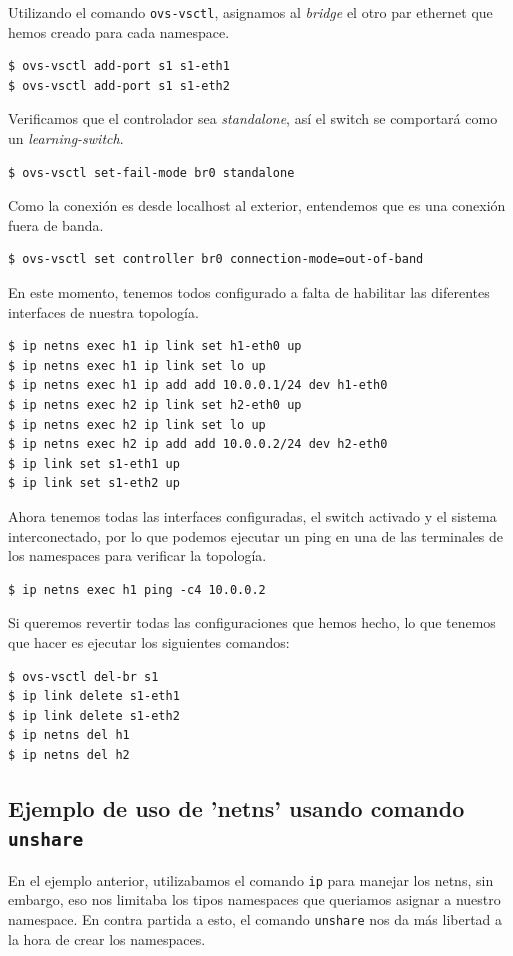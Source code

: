 \documentclass[12pt]{article}
\begin{document}
	\pagebreak
	
	\noindent Utilizando el comando \texttt{ovs-vsctl}, asignamos al \textit{bridge} el otro par ethernet que hemos creado para cada namespace.
	\begin{verbatim}
$ ovs-vsctl add-port s1 s1-eth1
$ ovs-vsctl add-port s1 s1-eth2
	\end{verbatim}

	\noindent Verificamos que el controlador sea \textit{standalone}, así el switch se comportará como un \textit{learning-switch}.
	\begin{verbatim}
$ ovs-vsctl set-fail-mode br0 standalone
	\end{verbatim}

	\noindent Como la conexión es desde localhost al exterior, entendemos que es una conexión fuera de banda.
	\begin{verbatim}
$ ovs-vsctl set controller br0 connection-mode=out-of-band
	\end{verbatim}

	\noindent En este momento, tenemos todos configurado a falta de habilitar las diferentes interfaces de nuestra topología.
	\begin{verbatim}
$ ip netns exec h1 ip link set h1-eth0 up
$ ip netns exec h1 ip link set lo up
$ ip netns exec h1 ip add add 10.0.0.1/24 dev h1-eth0
$ ip netns exec h2 ip link set h2-eth0 up
$ ip netns exec h2 ip link set lo up
$ ip netns exec h2 ip add add 10.0.0.2/24 dev h2-eth0
$ ip link set s1-eth1 up
$ ip link set s1-eth2 up
	\end{verbatim}

	\noindent Ahora tenemos todas las interfaces configuradas, el switch activado y el sistema interconectado, por lo que podemos ejecutar un ping en una de las terminales de los namespaces para verificar la topología.
	\begin{verbatim}
$ ip netns exec h1 ping -c4 10.0.0.2
	\end{verbatim}

	\noindent Si queremos revertir todas las configuraciones que hemos hecho, lo que tenemos que hacer es ejecutar los siguientes comandos:
	\begin{verbatim}
$ ovs-vsctl del-br s1
$ ip link delete s1-eth1
$ ip link delete s1-eth2
$ ip netns del h1
$ ip netns del h2
	\end{verbatim}

	\pagebreak

	\subsection{Ejemplo de uso de 'netns' usando comando \texttt{unshare}}
	\noindent En el ejemplo anterior, utilizabamos el comando \texttt{ip} para manejar los netns, sin embargo, eso nos limitaba los tipos namespaces que queriamos asignar a nuestro namespace. En contra partida a esto, el comando \texttt{unshare} nos da más libertad a la hora de crear los namespaces. \\
	
\end{document}
